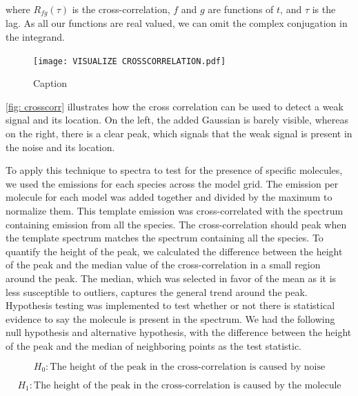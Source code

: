 \documentclass[twoside, single, authoryear, semicolon, 12pt]{lion-msc}
\newcommand{\4}{$_4$}
\newcommand{\3}{$_3$}
\newcommand{\2}{$_2$}
\begin{document}
where $R_{fg}(\tau)$ is the cross-correlation, $f$ and $g$ are functions of $t$, and $\tau$ is the lag. As all our functions are real valued, we can omit the complex conjugation in the integrand.

\begin{figure}[H]
    \centering
    \texttt{[image: VISUALIZE CROSSCORRELATION.pdf]}
    \caption{Caption}
    \label{fig: crosscorr vis}
\end{figure}

\autoref{fig: crosscorr} illustrates how the cross correlation can be used to detect a weak signal and its location. On the left, the added Gaussian is barely visible, whereas on the right, there is a clear peak, which signals that the weak signal is present in the noise and its location.

To apply this technique to spectra to test for the presence of specific molecules, we used the emissions for each species across the model grid. The emission per molecule for each model was added together and divided by the maximum to normalize them. This template emission was cross-correlated with the spectrum containing emission from all the species. The cross-correlation should peak when the template spectrum matches the spectrum containing all the species. To quantify the height of the peak, we calculated the difference between the height of the peak and the median value of the cross-correlation in a small region around the peak. The median, which was selected in favor of the mean as it is less susceptible to outliers, captures the general trend around the peak. Hypothesis testing was implemented to test whether or not there is statistical evidence to say the molecule is present in the spectrum. We had the following null hypothesis and alternative hypothesis, with the difference between the height of the peak and the median of neighboring points as the test statistic. 

\begin{equation}
    H_0: \text{The height of the peak in the cross-correlation is caused by noise}
\end{equation}

\begin{equation}
    H_1: \text{The height of the peak in the cross-correlation is caused by the molecule}
\end{equation}
\end{document}
